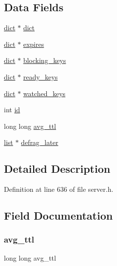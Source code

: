\subsection*{Data Fields}
\begin{DoxyCompactItemize}
\item 
\hyperlink{structdict}{dict} $\ast$ \hyperlink{structredis_db_aad961c2f260766ff3627bf363fef3551}{dict}
\item 
\hyperlink{structdict}{dict} $\ast$ \hyperlink{structredis_db_af8dcf36ca4b084db164becc8e1c71b67}{expires}
\item 
\hyperlink{structdict}{dict} $\ast$ \hyperlink{structredis_db_a439ca8f8cd0c2a19b8d2e0fe0044160d}{blocking\+\_\+keys}
\item 
\hyperlink{structdict}{dict} $\ast$ \hyperlink{structredis_db_a06ae0ac6a04c866ce83ece29d9a44073}{ready\+\_\+keys}
\item 
\hyperlink{structdict}{dict} $\ast$ \hyperlink{structredis_db_acf93a40c69ba9e3938f50aa3b1087abc}{watched\+\_\+keys}
\item 
int \hyperlink{structredis_db_a7441ef0865bcb3db9b8064dd7375c1ea}{id}
\item 
long long \hyperlink{structredis_db_a605ade426dd43b0de7ea393efa17d337}{avg\+\_\+ttl}
\item 
\hyperlink{structlist}{list} $\ast$ \hyperlink{structredis_db_ae22579f2281ceefa3099ad028f0c6260}{defrag\+\_\+later}
\end{DoxyCompactItemize}


\subsection{Detailed Description}


Definition at line 636 of file server.\+h.



\subsection{Field Documentation}
\mbox{\label{structredis_db_a605ade426dd43b0de7ea393efa17d337}} 
\subsubsection{\texorpdfstring{avg\+\_\+ttl}{avg\_ttl}}
{\footnotesize\ttfamily long long avg\+\_\+ttl}



